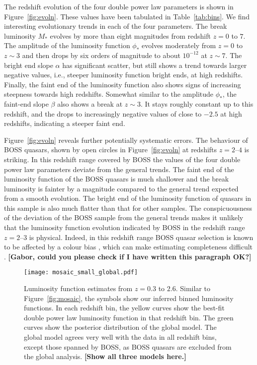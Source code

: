 \documentclass[a4paper,fleqn,usenatbib]{mnras}
\newcommand{\gk}[1]{{\bf \color{notecolor} [#1]}}
\begin{document}
The redshift evolution of the four double power law parameters is
shown in Figure~\ref{fig:evoln}.  These values have been tabulated in
Table~\ref{tab:bins}.  We find interesting evolutionary trends in each
of the four parameters.  The break luminosity $M_*$ evolves by more
than eight magnitudes from redshift $z=0$ to $7$.  The amplitude of
the luminosity function $\phi_*$ evolves moderately from $z=0$ to
$z\sim 3$ and then drops by six orders of magnitude to about
$10^{-12}$ at $z\sim 7$.  The bright end slope $\alpha$ has
significant scatter, but still shows a trend towards larger negative
values, i.e., steeper luminosity function bright ends, at high
redshifts.  Finally, the faint end of the luminosity function also
shows signs of increasing steepness towards high redshifts.  Somewhat
similar to the amplitude $\phi_*$, the faint-end slope $\beta$ also
shows a break at $z\sim 3$.  It stays roughly constant up to this
redshift, and the drops to increasingly negative values of close to
$-2.5$ at high redshifts, indicating a steeper faint end.

Figure~\ref{fig:evoln} reveals further potentially systematic errors.
The behaviour of BOSS quasars, shown by open circles in
Figure~\ref{fig:evoln} at redshifts $z=2$--$4$ is striking.  In this
redshift range covered by BOSS the values of the four double power law
parameters deviate from the general trends.  The faint end of the
luminosity function of the BOSS quasars is much shallower and the
break luminosity is fainter by a magnitude compared to the general
trend expected from a smooth evolution.  The bright end of the
luminosity function of quasars in this sample is also much flatter
than that for other samples.  The conspicuousness of the deviation of
the BOSS sample from the general trends makes it unlikely that the
luminosity function evolution indicated by BOSS in the redshift range
$z=2$--$3$ is physical.  Indeed, in this redshift range BOSS quasar
selection is known to be affected by a colour bias
\citep{2011ApJ...728...23W}, which can make estimating completeness
difficult \citep{2006AJ....131.2766R}.  \gk{Gabor, could you please
  check if I have written this paragraph OK?}

\begin{figure*}
  \begin{center}
    \texttt{[image: mosaic\_small\_global.pdf]}
  \end{center}
  \caption{Luminosity function estimates from $z=0.3$ to $2.6$.
    Similar to Figure~\ref{fig:mosaic}, the symbols show our inferred
    binned luminosity functions.  In each redshift bin, the yellow
    curves show the best-fit double power law luminosity function in
    that redshift bin.  The green curves show the posterior
    distribution of the global model.  The global model agrees very
    well with the data in all redshift bins, except those spanned by
    BOSS, as BOSS quasars are excluded from the global
    analysis. \gk{Show all three models here.}}
  \label{fig:mosaic_global}
\end{figure*}
\end{document}
